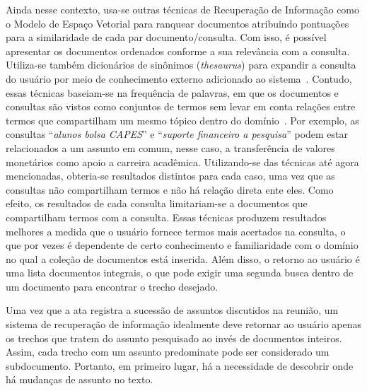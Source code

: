 Ainda nesse contexto, usa-se outras técnicas de Recuperação de Informação como o Modelo de Espaço Vetorial para ranquear documentos atribuindo pontuações para a similaridade de cada par documento/consulta. Com isso, é possível apresentar os documentos ordenados conforme a sua relevância com a consulta. Utiliza-se também dicionários de sinônimos (\textit{thesaurus}) para expandir a consulta do usuário por meio de conhecimento externo adicionado ao sistema~\cite{X,Y,Z}. %
%
Contudo, essas técnicas baseiam-se na frequência de palavras, em que os documentos e consultas são vistos como conjuntos de termos sem levar em conta relações entre termos que compartilham um mesmo tópico dentro do domínio~\cite{WEIXING}. Por exemplo, as consultas ``\textit{alunos bolsa CAPES}'' e ``\textit{suporte financeiro a pesquisa}'' 
podem estar relacionados a um assunto em comum,
nesse caso, a transferência de valores monetários como apoio a carreira acadêmica.
Utilizando-se das técnicas até agora mencionadas, obteria-se resultados distintos para cada caso, uma vez que as consultas não compartilham termos e não há relação direta ente eles. Como efeito, os resultados de cada consulta limitariam-se a documentos que compartilham termos com a consulta.
Essas técnicas produzem resultados melhores a medida que o usuário fornece termos mais acertados na consulta, o que por vezes é dependente de certo conhecimento e familiaridade com o domínio no qual a coleção de documentos está inserida. 
% 
Além disso, o retorno ao usuário é uma lista documentos integrais, o que pode exigir uma segunda busca dentro de um documento para encontrar o trecho desejado.





% 
% 
Uma vez que a ata registra a sucessão de assuntos discutidos na reunião, um sistema de recuperação de informação idealmente deve retornar ao usuário apenas os trechos que tratem do assunto pesquisado ao invés de documentos inteiros. Assim, cada trecho com um assunto predominate pode ser considerado um subdocumento. Portanto, em primeiro lugar, há a necessidade de descobrir onde há mudanças de assunto no texto. 


